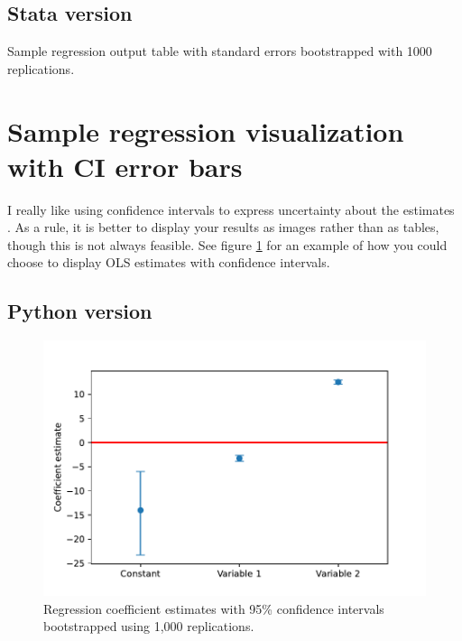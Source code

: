 \documentclass{article}
\begin{document}
\subsection{Stata version}

\begin{table}[ht]
    \centering
    
    \caption{Sample regression output table with standard errors bootstrapped with 1000 replications.}
    \label{tab:regression_output}
\end{table}

\section{Sample regression visualization with CI error bars}
I really like using confidence intervals to express uncertainty about the estimates \citep[see e.g.,][]{zm2009}.  As a rule, it is better to display your results as images rather than as tables, though this is not always feasible. See figure \ref{fig:samplebars} for an example of how you could choose to display OLS estimates with confidence intervals.

\subsection{Python version}

\begin{figure}[ht]
    \centering
    \includegraphics[scale = 0.7]{samplebars.pdf}
    \caption{Regression coefficient estimates with 95\% confidence intervals bootstrapped using 1,000 replications.}
    \label{fig:samplebars}
\end{figure}
\end{document}
